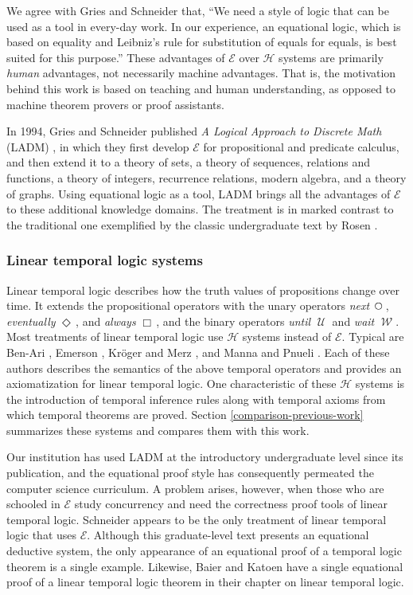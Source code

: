 \documentclass[12pt, fleqn, leqno]{article}
\newcommand{\Until}{\;\mathcal{U}\;}
\newcommand{\Wait}{\;\mathcal{W}\;}
\newcommand{\Next}{\;\,\text{\raisebox{3.5pt}{\circle{6}}}}
\newcommand{\Event}{\Diamond\,}
\newcommand{\Always}{\Box\,}
\begin{document}
We agree with Gries and Schneider \cite{LADM} that, ``We need a style of logic that can be used as a tool in every-day work.
In our experience, an equational logic, which is based on equality and Leibniz's rule for substitution of equals for equals, is best suited for this purpose.''
These advantages of $\mathcal{E}$ over $\mathcal{H}$ systems are primarily \textit{human} advantages, not necessarily machine advantages.
That is, the motivation behind this work is based on teaching and human understanding, as opposed to machine theorem provers or proof assistants.

In 1994, Gries and Schneider published \textit{A Logical Approach to Discrete Math} (LADM) \cite{LADM}, in which they first develop $\mathcal{E}$ for propositional and predicate calculus, and then extend it to a theory of sets, a theory of sequences, relations and functions, a theory of integers, recurrence relations, modern algebra, and a theory of graphs.
Using equational logic as a tool, LADM brings all the advantages of $\mathcal{E}$ to these additional knowledge domains.
The treatment is in marked contrast to the traditional one exemplified by the classic undergraduate text by Rosen \cite{Rosen}.

\subsubsection*{Linear temporal logic systems}

Linear temporal logic describes how the truth values of propositions change over time.
It extends the propositional operators with the unary operators \textit{next} $\Next$, \textit{eventually} $\Event$, and \textit{always} $\Always$, and the binary operators \textit{until} $\Until$ and \textit{wait} $\Wait$.
Most treatments of linear temporal logic use $\mathcal{H}$ systems instead of $\mathcal{E}$.
Typical are Ben-Ari \cite{Ben2}, Emerson \cite{Emer}, Kröger and Merz \cite{Kroger}, and Manna and Pnueli \cite{Manna}.
Each of these authors describes the semantics of the above temporal operators and provides an axiomatization for linear temporal logic.
One characteristic of these $\mathcal{H}$ systems is the introduction of temporal inference rules along with temporal axioms from which temporal theorems are proved.
Section \ref{comparison-previous-work} summarizes these systems and compares them with this work.

Our institution has used LADM at the introductory undergraduate level since its publication, and the equational proof style has consequently permeated the computer science curriculum.
A problem arises, however, when those who are schooled in $\mathcal{E}$ study concurrency and need the correctness proof tools of linear temporal logic.
Schneider \cite{Schn} appears to be the only treatment of linear temporal logic that uses $\mathcal{E}$.
Although this graduate-level text presents an equational deductive system, the only appearance of an equational proof of a temporal logic theorem is a single example.
Likewise, Baier and Katoen \cite{Baier} have a single equational proof of a linear temporal logic theorem in their chapter on linear temporal logic.
\end{document}
